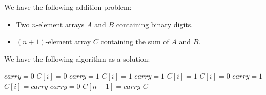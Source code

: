 We have the following addition problem:

\begin{itemize}
  \item[\textbf{Input:}] Two $n$-element arrays $A$ and $B$
    containing binary digits.
  \item[\textbf{Output:}] $(n+1)$-element array $C$ containing the
    sum of $A$ and $B$.
\end{itemize}

We have the following algorithm as a solution:

\begin{algorithmic}[1]
  \STATE $\mathit{carry} = 0$
  \STATE $C[i] = 0$
  \STATE $\mathit{carry} = 1$
  \ELSE
  \STATE $C[i] = 1$
  \STATE $\mathit{carry} = 1$
  \ENDIF
  \STATE $C[i] = 1$
  \ELSE
  \STATE $C[i] = 0$
  \STATE $\mathit{carry} = 1$
  \ENDIF
  \ELSE
  \STATE $C[i] = \mathit{carry}$
  \STATE $\mathit{carry} = 0$
  \ENDIF
  \ENDFOR
  \STATE $C[n + 1] = \mathit{carry}$
  \RETURN $C$
\end{algorithmic}

